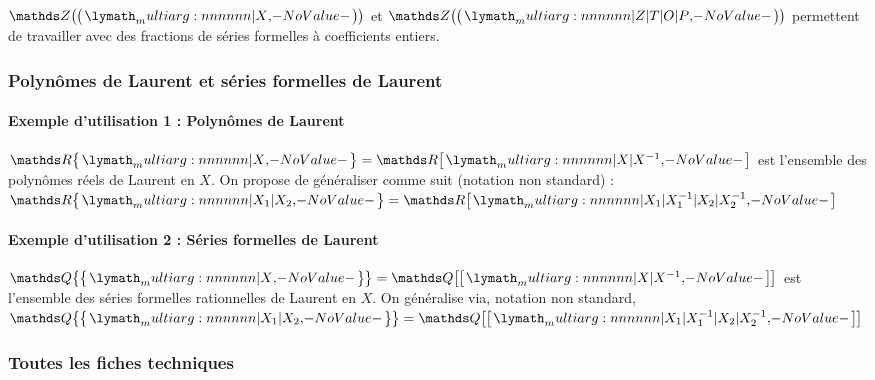 \documentclass[12pt,a4paper]{article}
\theoremstyle{definition}
\begin{document}
\begin{tcblisting}{}
$\setseriefrac{\ZZ}{X}$ et $\setseriefrac{\ZZ}{Z | T | O | P}$ permettent de travailler
avec des fractions de séries formelles à coefficients entiers.
\end{tcblisting}



\subsubsection{Polynômes de Laurent et séries formelles de Laurent}

\paragraph{Exemple d'utilisation 1 : Polynômes de Laurent}

\begin{tcblisting}{}
$\setpolylaurent{\RR}{X} = \setpoly{\RR}{X | X^{-1}}$ est l'ensemble des polynômes
réels de Laurent en $X$. On propose de généraliser comme suit (notation non standard) :
$\setpolylaurent{\RR}{X_1 | X_2} = \setpoly{\RR}{X_1 | X_1^{-1} | X_2 | X_2^{-1}}$
\end{tcblisting}



\paragraph{Exemple d'utilisation 2 : Séries formelles de Laurent}

\begin{tcblisting}{}
$\setserielaurent{\QQ}{X} = \setserie{\QQ}{X | X^{-1}}$ est l'ensemble des séries
formelles rationnelles de Laurent en $X$. On généralise via, notation non standard,
$\setserielaurent{\QQ}{X_1 | X_2} = \setserie{\QQ}{X_1 | X_1^{-1} | X_2 | X_2^{-1}}$
\end{tcblisting}



\subsubsection{Toutes les fiches techniques}





\end{document}

